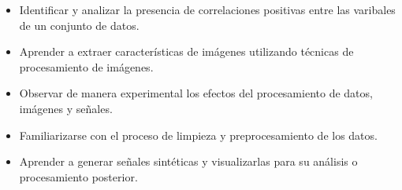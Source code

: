 \begin{itemize}
    \item[$\alpha_1.$] Identificar y analizar la presencia de correlaciones positivas entre las varibales de un conjunto de datos. 
    \item[$\alpha_2.$] Aprender a extraer características de imágenes utilizando técnicas de procesamiento de imágenes. 
    \item[$\alpha_3.$] Observar de manera experimental los efectos del procesamiento de datos, imágenes y señales.
    \item[$\alpha_4.$] Familiarizarse con el proceso de limpieza y preprocesamiento de los datos. 
    \item[$\alpha_5.$] Aprender a generar señales sintéticas y visualizarlas para su análisis o procesamiento posterior.   
\end{itemize}